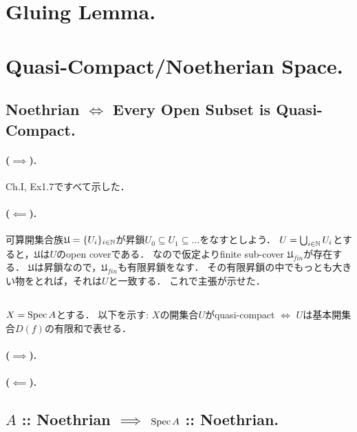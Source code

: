 \documentclass[a4paper]{jsarticle}
\begin{document}
\section{Gluing Lemma.} %

\section{Quasi-Compact/Noetherian Space.} %
    \subsection{Noethrian $\iff$ Every Open Subset is Quasi-Compact.}
    \paragraph{($\implies$).}
    Ch.I, Ex1.7ですべて示した．

    \paragraph{($\impliedby$).}
    可算開集合族$\mathfrak{U}=\{U_i\}_{i \in \mathbb{N}}$が昇鎖$U_0 \subseteq U_1 \subseteq \dots$をなすとしよう．
    $U=\bigcup_{i \in \mathbb{N}} U_i$とすると，$\mathfrak{U}$は$U$のopen coverである．
    なので仮定よりfinite sub-cover $\mathfrak{U}_{fin}$が存在する．
    $\mathfrak{U}$は昇鎖なので，$\mathfrak{U}_{fin}$も有限昇鎖をなす．
    その有限昇鎖の中でもっとも大きい物をとれば，それは$U$と一致する．
    これで主張が示せた．

    \subsection{}
    $X=\operatorname{Spec} A$とする．
    以下を示す: $X$の開集合$U$がquasi-compact $\iff$ $U$は基本開集合$D(f)$の有限和で表せる．

    \paragraph{($\implies$).}

    \paragraph{($\impliedby$).}

    \subsection{$A$ :: Noethrian $\implies$ $\operatorname{Spec} A$ :: Noethrian.}
\end{document}
